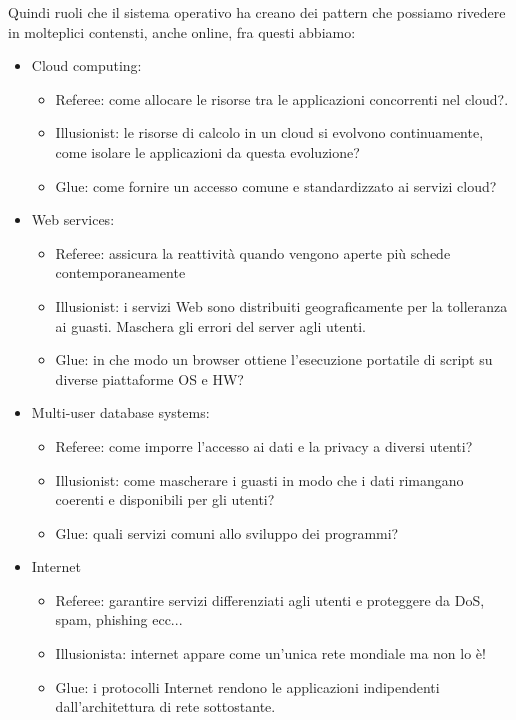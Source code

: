 \hspace{-15pt}Quindi ruoli che il sistema operativo ha creano dei pattern che possiamo rivedere
in molteplici contensti, anche online, fra questi abbiamo:
\begin{itemize}
    \item Cloud computing:
    \begin{itemize}
        \item Referee: come allocare le risorse tra le applicazioni concorrenti nel cloud?.
        \item Illusionist: le risorse di calcolo in un cloud si evolvono continuamente, come isolare le applicazioni da questa evoluzione?
        \item Glue: come fornire un accesso comune e standardizzato ai servizi cloud?
    \end{itemize}

    \item Web services: 
    \begin{itemize}
        \item Referee: assicura la reattività quando vengono aperte più schede contemporaneamente
        \item Illusionist: i servizi Web sono distribuiti geograficamente per la tolleranza ai guasti. Maschera gli errori del server agli utenti.
        \item Glue: in che modo un browser ottiene l'esecuzione portatile di script su diverse piattaforme OS e HW?
    \end{itemize}

    \item Multi-user database systems:
    \begin{itemize}
        \item Referee: come imporre l'accesso ai dati e la privacy a diversi utenti?
        \item Illusionist: come mascherare i guasti in modo che i dati rimangano coerenti e disponibili per gli utenti?
        \item Glue: quali servizi comuni allo sviluppo dei programmi?
    \end{itemize}

    \item Internet
    \begin{itemize}
        \item Referee: garantire servizi differenziati agli utenti e proteggere da DoS, spam, phishing ecc...
        \item Illusionista: internet appare come un'unica rete mondiale ma non lo è!
        \item Glue: i protocolli Internet rendono le applicazioni indipendenti dall'architettura di rete sottostante.
    \end{itemize}
\end{itemize}

